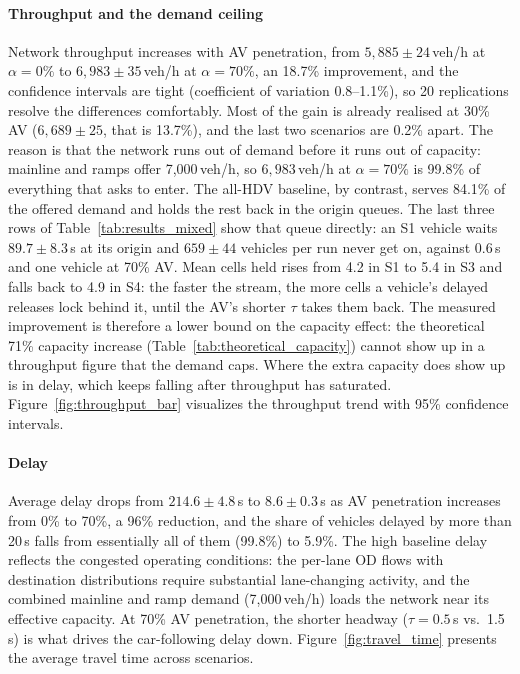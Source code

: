 \documentclass[review,number]{elsarticle}
\begin{document}
\paragraph{Throughput and the demand ceiling} Network throughput increases with AV penetration, from $5{,}885 \pm 24$\,veh/h at $\alpha = 0\%$ to $6{,}983 \pm 35$\,veh/h at $\alpha = 70\%$, an 18.7\% improvement, and the confidence intervals are tight (coefficient of variation 0.8--1.1\%), so 20 replications resolve the differences comfortably. Most of the gain is already realised at 30\% AV ($6{,}689 \pm 25$, that is 13.7\%), and the last two scenarios are 0.2\% apart. The reason is that the network runs out of demand before it runs out of capacity: mainline and ramps offer 7{,}000\,veh/h, so $6{,}983$\,veh/h at $\alpha = 70\%$ is 99.8\% of everything that asks to enter. The all-HDV baseline, by contrast, serves 84.1\% of the offered demand and holds the rest back in the origin queues. The last three rows of Table~\ref{tab:results_mixed} show that queue directly: an S1 vehicle waits $89.7 \pm 8.3$\,s at its origin and $659 \pm 44$ vehicles per run never get on, against $0.6$\,s and one vehicle at 70\% AV. Mean cells held rises from 4.2 in S1 to 5.4 in S3 and falls back to 4.9 in S4: the faster the stream, the more cells a vehicle's delayed releases lock behind it, until the AV's shorter $\tau$ takes them back. The measured improvement is therefore a lower bound on the capacity effect: the theoretical 71\% capacity increase (Table~\ref{tab:theoretical_capacity}) cannot show up in a throughput figure that the demand caps. Where the extra capacity does show up is in delay, which keeps falling after throughput has saturated. Figure~\ref{fig:throughput_bar} visualizes the throughput trend with 95\% confidence intervals.

\paragraph{Delay} Average delay drops from $214.6 \pm 4.8$\,s to $8.6 \pm 0.3$\,s as AV penetration increases from 0\% to 70\%, a 96\% reduction, and the share of vehicles delayed by more than 20\,s falls from essentially all of them (99.8\%) to 5.9\%. The high baseline delay reflects the congested operating conditions: the per-lane OD flows with destination distributions require substantial lane-changing activity, and the combined mainline and ramp demand (7{,}000\,veh/h) loads the network near its effective capacity. At 70\% AV penetration, the shorter headway ($\tau = 0.5$\,s vs.\ 1.5\,s) is what drives the car-following delay down. Figure~\ref{fig:travel_time} presents the average travel time across scenarios.
\end{document}
